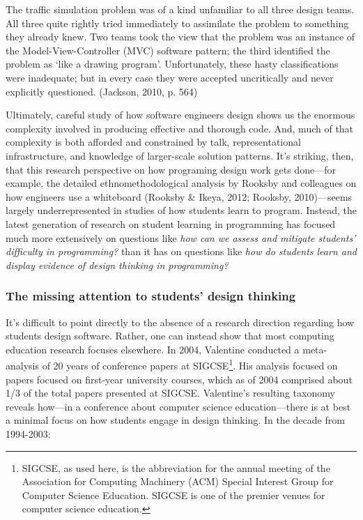 The traffic simulation problem was of a kind unfamiliar to all three
design teams. All three quite rightly tried immediately to assimilate
the problem to something they already knew. Two teams took the view that
the problem was an instance of the Model-View-Controller (MVC) software
pattern; the third identified the problem as `like a drawing program'.
Unfortunately, these hasty classifications were inadequate; but in every
case they were accepted uncritically and never explicitly questioned.
(Jackson, 2010, p. 564)

Ultimately, careful study of how software engineers design shows us the
enormous complexity involved in producing effective and thorough code.
And, much of that complexity is both afforded and constrained by talk,
representational infrastructure, and knowledge of larger-scale solution
patterns. It's striking, then, that this research perspective on how
programing design work gets done---for example, the detailed
ethnomethodological analysis by Rooksby and colleagues on how engineers
use a whiteboard (Rooksby \& Ikeya, 2012; Rooksby, 2010)---seems largely
underrepresented in studies of how students learn to program. Instead,
the latest generation of research on student learning in programming has
focused much more extensively on questions like \emph{how can we assess
and mitigate students' difficulty in programming?} than it has on
questions like \emph{how do students learn and display evidence of
design thinking in programming?}

\subsubsection{The missing attention to students' design
thinking}\label{the-missing-attention-to-students-design-thinking}

It's difficult to point directly to the absence of a research direction
regarding how students design software. Rather, one can instead show
that most computing education research focuses elsewhere. In 2004,
Valentine conducted a meta-analysis of 20 years of conference papers at
SIGCSE\footnote{SIGCSE, as used here, is the abbreviation for the annual
  meeting of the Association for Computing Machinery (ACM) Special
  Interest Group for Computer Science Education. SIGCSE is one of the
  premier venues for computer science education.}. His analysis focused
on papers focused on first-year university courses, which as of 2004
comprised about 1/3 of the total papers presented at SIGCSE. Valentine's
resulting taxonomy reveals how---in a conference about computer science
education---there is at best a minimal focus on how students engage in
design thinking. In the decade from 1994-2003:

